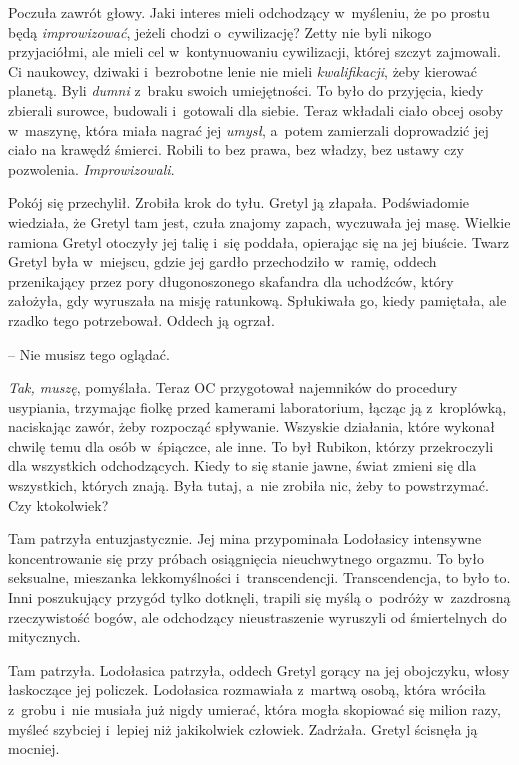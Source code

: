 \documentclass[oneside,polish,11pt,sfheadings]{mwbk}
\begin{document}
Poczuła zawrót głowy. Jaki interes mieli odchodzący w~myśleniu, że po
prostu będą \textit{improwizować}, jeżeli chodzi o~cywilizację? Zetty nie
byli nikogo przyjaciółmi, ale mieli cel w~kontynuowaniu cywilizacji,
której szczyt zajmowali. Ci naukowcy, dziwaki i~bezrobotne lenie nie
mieli \textit{kwalifikacji}, żeby kierować planetą. Byli \textit{dumni} z~braku swoich umiejętności. To było do przyjęcia, kiedy zbierali surowce,
budowali i~gotowali dla siebie. Teraz wkładali ciało obcej osoby w~maszynę, która miała nagrać jej \textit{umysł}, a~potem zamierzali
doprowadzić jej ciało na krawędź śmierci. Robili to bez prawa, bez
władzy, bez ustawy czy pozwolenia. \textit{Improwizowali}.

Pokój się przechylił. Zrobiła krok do tyłu. Gretyl ją złapała.
Podświadomie wiedziała, że Gretyl tam jest, czuła znajomy zapach,
wyczuwała jej masę. Wielkie ramiona Gretyl otoczyły jej talię i~się
poddała, opierając się na jej biuście. Twarz Gretyl była w~miejscu,
gdzie jej gardło przechodziło w~ramię, oddech przenikający przez pory
długonoszonego skafandra dla uchodźców, który założyła, gdy wyruszała na
misję ratunkową. Spłukiwała go, kiedy pamiętała, ale rzadko tego
potrzebował. Oddech ją ogrzał.

-- Nie musisz tego oglądać.

\textit{Tak, muszę}, pomyślała. Teraz OC przygotował najemników do
procedury usypiania, trzymając fiolkę przed kamerami laboratorium,
łącząc ją z~kroplówką, naciskając zawór, żeby rozpocząć spływanie.
Wszyskie działania, które wykonał chwilę temu dla osób w~śpiączce, ale
inne. To był Rubikon, którzy przekroczyli dla wszystkich odchodzących.
Kiedy to się stanie jawne, świat zmieni się dla wszystkich, których
znają. Była tutaj, a~nie zrobiła nic, żeby to powstrzymać. Czy
ktokolwiek?

Tam patrzyła entuzjastycznie. Jej mina przypominała Lodołasicy
intensywne koncentrowanie się przy próbach osiągnięcia nieuchwytnego
orgazmu. To było seksualne, mieszanka lekkomyślności i~transcendencji.
Transcendencja, to było to. Inni poszukujący przygód tylko dotknęli,
trapili się myślą o~podróży w~zazdrosną rzeczywistość bogów, ale
odchodzący nieustraszenie wyruszyli od śmiertelnych do mitycznych.

Tam patrzyła. Lodołasica patrzyła, oddech Gretyl gorący na jej
obojczyku, włosy łaskoczące jej policzek. Lodołasica rozmawiała z~martwą
osobą, która wróciła z~grobu i~nie musiała już nigdy umierać, która
mogła skopiować się milion razy, myśleć szybciej i~lepiej niż
jakikolwiek człowiek. Zadrżała. Gretyl ścisnęła ją mocniej.
\end{document}
